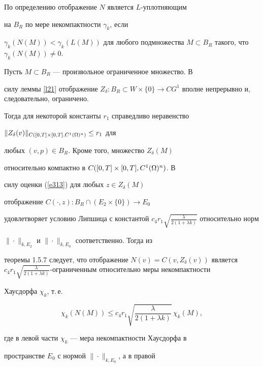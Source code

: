 \begin{pf}


По определению отображение $N$ является $L$-уплотняющим 


на $B_R$ по мере некомпактности $\gamma_k$, если


$\gamma_k(N(M))<\gamma_k(L(M))$ для любого подмножества $M


\subset B_R$ такого, что $ \gamma_k(N(M))\ne0$.





Пусть $M\subset B_R$ --- произвольное ограниченное множество. В


силу леммы \ref{l21} отображение $Z_{\delta}:B_R\subset W\times


\{0\}\to CG^1$ вполне непрерывно и, следовательно, ограничено.


Тогда для некоторой константы $r_1$ справедливо неравенство


$\|Z_{\delta}(v)\|_{C([0,T]\times [0,T], C^1(\Omega)^n)}\le r_1$ для


любых $(v,p)\in B_R$. Кроме того, множество $Z_{\delta}(M)$


относительно компактно в $C([0,T]\times [0,T], C^1(\Omega)^n)$. В


силу оценки (\ref{e313}) для любых $z \in Z_{\delta}(M)$


отображение $C(\cdot,z):B_R\cap (E_2 \times \{0\})\to E_0$


удовлетворяет условию Липшица с константой $c_4 r_1 \sqrt


{\frac{\lambda}{2(1+\lambda k)}}$ относительно норм


$\|\cdot\|_{k,E_2}$ и $\|\cdot\|_{k,E_0}$ соответственно. Тогда из


теоремы 1.5.7 \cite{AKP} следует, что отображение $N(v)=


C(v,Z_{\delta}(v))$ является $c_4 r_1\sqrt {\frac{\lambda}{2(1


+\lambda k)}}$-ограниченным относительно меры некомпактности


Хаусдорфа $\chi_k$, т.\,е.


$$


\chi_k(N(M)) \le c_4 r_1 \sqrt {\frac{\lambda}{2(1+\lambda


k)}}\, \chi_k(M),


$$


где в левой части $\chi_k$ --- мера некомпактности Хаусдорфа в


пространстве $E_0$ с нормой $\|\cdot\|_{k,E_0}$, а в правой



\end{pf}
